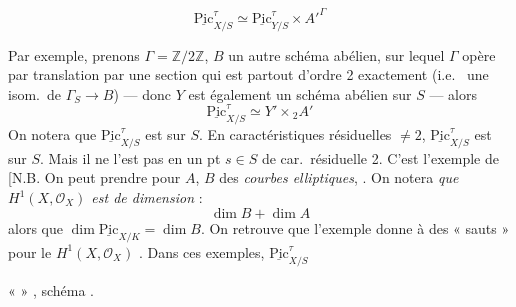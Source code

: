 \documentclass[11pt,a4paper]{article}
\begin{document}

\[
\underline{\mathrm{Pic}}^{\tau}_{X/S} \simeq \underline{\mathrm{Pic}}^{\tau}_{Y/S} \times A'^{\Gamma}
\]

Par exemple, prenons $\Gamma = \mathbb{Z}/2\mathbb{Z}$,  $B$ un autre schéma abélien, sur lequel $\Gamma$ opère par translation par une section qui est partout d'ordre 2 exactement (i.e.\ \ill{} \ill{} une isom.\ de $\Gamma_S \to B$) --- donc $Y$ est également un schéma abélien sur $S$ --- alors
\[
\underline{\mathrm{Pic}}^{\tau}_{X/S} \simeq Y' \times {}_2A'
\]
On notera que $\underline{\mathrm{Pic}}^{\tau}_{X/S}$ est  sur $S$. En caractéristiques résiduelles $\neq 2$, $\underline{\mathrm{Pic}}^{\tau}_{X/S}$ est  \emph{} sur $S$. Mais il ne l'est pas en un pt $s \in S$ de car.\ résiduelle 2. C'est l'exemple de \emph{} [N.B. On peut prendre pour $A$, $B$ des \emph{courbes elliptiques}, \ill{} \ill{} \emph{}.   On notera \emph{que $H^1(X, \mathcal{O}_X)$ est de dimension}  :
\[
\dim B + \dim A
\]
alors que $\dim \underline{\mathrm{Pic}}_{X/K} = \dim B$. On retrouve que l'exemple  donne  à des « sauts » pour le $H^1(X, \mathcal{O}_X)$ \ill{}  . Dans ces exemples, $\underline{\mathrm{Pic}}^{\tau}_{X/S}$ \ill{}

 \ill{} «  » \ill{}, \ill{} schéma .
\end{document}
